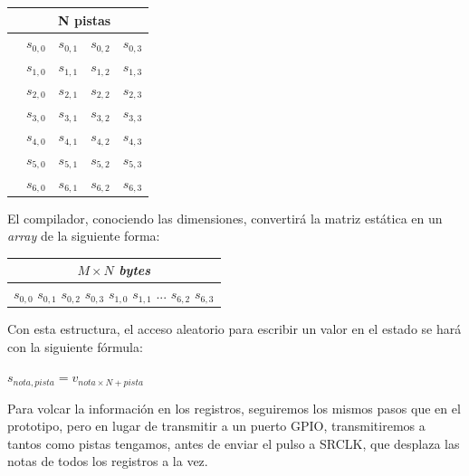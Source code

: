 \begin{center}
	\begin{tabular}{|c|cccc|}
		\hline & \multicolumn{4}{c|}{N pistas} \\
		\hline \multirow{7}{*}{\rotatebox[]{90}{M notas}} & $s_{0,0}$ & $s_{0,1}$ & $s_{0,2}$ & $s_{0,3}$ \\
		& $s_{1,0}$ & $s_{1,1}$ & $s_{1,2}$ & $s_{1,3}$ \\
		& $s_{2,0}$ & $s_{2,1}$ & $s_{2,2}$ & $s_{2,3}$ \\
		& $s_{3,0}$ & $s_{3,1}$ & $s_{3,2}$ & $s_{3,3}$ \\
		& $s_{4,0}$ & $s_{4,1}$ & $s_{4,2}$ & $s_{4,3}$ \\
		& $s_{5,0}$ & $s_{5,1}$ & $s_{5,2}$ & $s_{5,3}$ \\
		& $s_{6,0}$ & $s_{6,1}$ & $s_{6,2}$ & $s_{6,3}$ \\
		\hline 
	\end{tabular}
	\smallskip
\end{center}

\smallskip

El compilador, conociendo las dimensiones, convertirá la matriz estática en un \textit{array} de la siguiente forma:

\smallskip

\begin{center}
	\begin{tabular}{|c|}
		\hline $M\times N$ \textit{bytes} \\
		\hline $s_{0,0}$ $s_{0,1}$ $s_{0,2}$ $s_{0,3}$ $s_{1,0}$ $s_{1,1}$ ... $s_{6,2}$  $s_{6,3}$ \\
		\hline 
	\end{tabular}
	\smallskip
\end{center}

\smallskip

Con esta estructura, el acceso aleatorio para escribir un valor en el estado se hará con la siguiente fórmula:

\begin{center}
	$s_{nota,pista} = v_{nota \times N + pista}$
\end{center}

Para volcar la información en los registros, seguiremos los mismos pasos que en el prototipo, pero en lugar de transmitir a un puerto \acrshort{GPIO}, transmitiremos a tantos como pistas tengamos, antes de enviar el pulso a SRCLK, que desplaza las notas de todos los registros a la vez.

